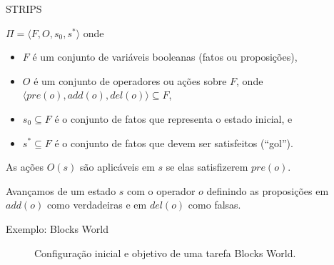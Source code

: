 \documentclass{beamer}
\begin{document}
\begin{frame}{STRIPS}
  \begin{definition}
    $\Pi = \langle F, O, s_{0}, s^{*}\rangle$ onde
    \begin{itemize}
        \item $F$ é um conjunto de variáveis booleanas (\alert{fatos} ou \alert{proposições}),
        \item $O$ é um conjunto de \alert{operadores} ou ações sobre $F$, onde $\langle pre(o), add(o), del(o) \rangle \subseteq F$,
        \item $s_{0} \subseteq F$ é o conjunto de fatos que representa o \alert{estado inicial}, e
        \item $s^{*} \subseteq F$ é o conjunto de fatos que devem ser satisfeitos (``\alert{gol}'').
    \end{itemize}
   \pause
    As ações $O(s)$ são \alert{aplicáveis} em $s$ se elas satisfizerem $pre(o)$.

    Avançamos de um estado $s$ com o operador $o$ definindo as proposições em $add(o)$ como \alert{verdadeiras} e em $del(o)$ como \alert{falsas}.
\end{definition}
\end{frame}

\begin{frame}{Exemplo: Blocks World}

\begin{figure}[ht]
\caption[]{Configuração inicial e objetivo de uma tarefa Blocks World.}
\centering
{}
\end{figure}
\end{frame}
\end{document}
